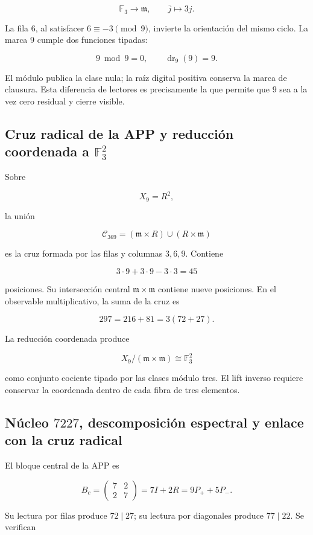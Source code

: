 \[
\mathbb F_3\longrightarrow\mathfrak m,
\qquad
\bar j\longmapsto3j.
\]

La fila \(6\), al satisfacer \(6\equiv-3\pmod9\), invierte la orientación del mismo ciclo. La marca \(9\) cumple dos funciones tipadas:

\[
9\bmod9=0,
\qquad
\operatorname{dr}_9(9)=9.
\]

El módulo publica la clase nula; la raíz digital positiva conserva la marca de clausura. Esta diferencia de lectores es precisamente la que permite que \(9\) sea a la vez cero residual y cierre visible.

\subsection{Cruz radical de la APP y reducción coordenada a \(\mathbb F_3^2\)}

Sobre

\[
X_9=R^2,
\]

la unión

\[
\mathscr C_{369}
=(\mathfrak m\times R)\cup(R\times\mathfrak m)
\]

es la cruz formada por las filas y columnas \(3,6,9\). Contiene

\[
3\cdot9+3\cdot9-3\cdot3=45
\]

posiciones. Su intersección central \(\mathfrak m\times\mathfrak m\) contiene nueve posiciones. En el observable multiplicativo, la suma de la cruz es

\[
297=216+81=3(72+27).
\]

La reducción coordenada produce

\[
X_9/(\mathfrak m\times\mathfrak m)\cong\mathbb F_3^2
\]

como conjunto cociente tipado por las clases módulo tres. El lift inverso requiere conservar la coordenada dentro de cada fibra de tres elementos.

\subsection{Núcleo \(7227\), descomposición espectral y enlace con la cruz radical}

El bloque central de la APP es

\[
B_c=
\begin{pmatrix}
7&2\\
2&7
\end{pmatrix}
=7I+2R
=9P_++5P_-.
\]

Su lectura por filas produce \(72\mid27\); su lectura por diagonales produce \(77\mid22\). Se verifican

